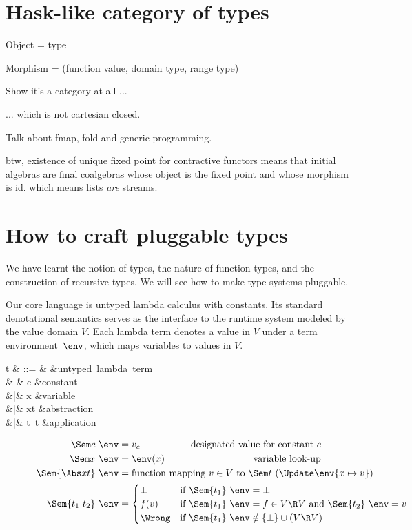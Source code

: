 \documentclass{amsart}
\begin{document}
\section{Hask-like category of types}

\label{domain-theory-ends}

Object = type

Morphism = (function value, domain type, range type)

Show it's a category at all ...

... which is not cartesian closed.

Talk about fmap, fold and generic programming.

btw, existence of unique fixed point for contractive functors
means that initial algebras are final coalgebras whose object is
the fixed point and whose morphism is id. which means lists
\emph{are} streams.



\section{How to craft pluggable types}
\label{howto}

We have learnt the notion of types, the nature of function types,
and the construction of recursive types. We will see how to make
type systems pluggable.

Our core language is untyped lambda calculus with constants. Its
standard denotational semantics serves as the interface to the
runtime system modeled by the value domain $V$. Each lambda term
denotes a value in $V$ under a term environment~$\env$, which
maps variables to values in $V$.

\begin{syntax}
t & ::= & &\mbox{untyped lambda term} \\
& & c &\mbox{constant} \\
&|& x &\mbox{variable} \\
&|& \Abs xt &\mbox{abstraction} \\
&|& t~t &\mbox{application}
\end{syntax}
%
\begin{align*}
\Sem c~\env &= v_c & \mbox{designated value for constant }c\\
\Sem x~\env &= \env(x) & \mbox{variable look-up}\\
\Sem{\Abs x t}~\env &=
\rlap{function mapping $v\in V$ to $\Sem t~(\Update\env{x\mapsto v})$}\\
\Sem{t_1~t_2}~\env &=
\begin{cases}
\bot&\rlap{if $\Sem{t_1}~\env=\bot$}\\
f(v)&\rlap{if $\Sem{t_1}~\env=f\in V\R V$ and $\Sem{t_2}~\env=v$}\\
\Wrong&\rlap{if $\Sem{t_1}~\env\notin \{\bot\}\cup(V\R V)$}
\end{cases}
\end{align*}
\end{document}
